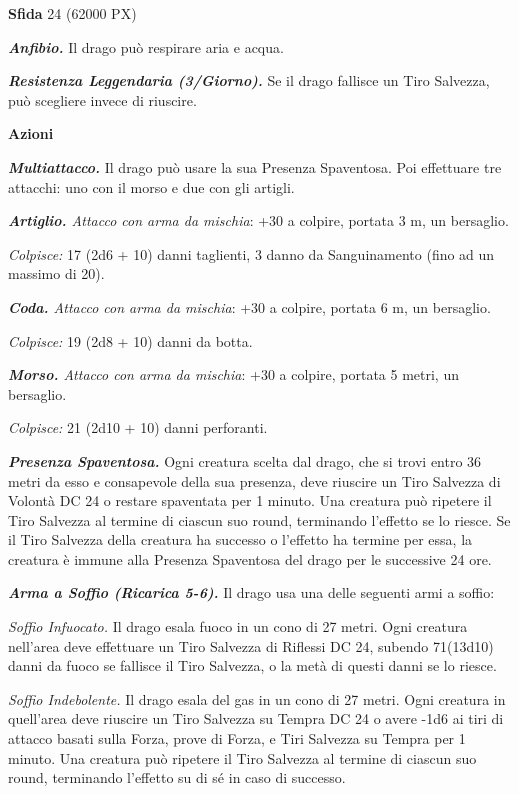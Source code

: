 \begin{multicols}{2}
\textbf{Sfida} 24 (62000 PX)

\textit{\textbf{Anfibio.}} Il drago può respirare aria e acqua.

\textit{\textbf{Resistenza Leggendaria (3/Giorno).}} Se il drago fallisce un Tiro Salvezza, può scegliere invece di riuscire.

\textbf{Azioni}

\textit{\textbf{Multiattacco.}} Il drago può usare la sua Presenza Spaventosa. Poi effettuare tre attacchi: uno con il morso e due con gli artigli.

\textit{\textbf{Artiglio.} Attacco con arma da mischia}: +30 a colpire, portata 3 m, un bersaglio.

\textit{Colpisce:} 17 (2d6 + 10) danni taglienti, 3 danno da Sanguinamento (fino ad un massimo di 20).

\textit{\textbf{Coda.} Attacco con arma da mischia}: +30 a colpire, portata 6 m, un bersaglio.

\textit{Colpisce:} 19 (2d8 + 10) danni da botta.

\textit{\textbf{Morso.} Attacco con arma da mischia}: +30 a colpire, portata 5 metri, un bersaglio.

\textit{Colpisce:} 21 (2d10 + 10) danni perforanti.

\textit{\textbf{Presenza Spaventosa.}} Ogni creatura scelta dal drago, che si trovi entro 36 metri da esso e consapevole della sua presenza, deve riuscire un Tiro Salvezza di Volontà DC 24 o restare spaventata per 1 minuto. Una creatura può ripetere il Tiro Salvezza al termine di ciascun suo round, terminando l'effetto se lo riesce. Se il Tiro Salvezza della creatura ha successo o l'effetto ha termine per essa, la creatura è immune alla Presenza Spaventosa del drago per le successive 24 ore.

\textit{\textbf{Arma a Soffio (Ricarica 5-6).}} Il drago usa una delle seguenti armi a soffio:

\textit{Soffio Infuocato.} Il drago esala fuoco in un cono di 27 metri. Ogni creatura nell'area deve effettuare un Tiro Salvezza di Riflessi DC 24, subendo 71(13d10) danni da fuoco se fallisce il Tiro Salvezza, o la metà di questi danni se lo riesce.

\textit{Soffio Indebolente.} Il drago esala del gas in un cono di 27 metri. Ogni creatura in quell'area deve riuscire un Tiro Salvezza su Tempra DC 24 o avere -1d6 ai tiri di attacco basati sulla Forza, prove di Forza, e Tiri Salvezza su Tempra per 1 minuto. Una creatura può ripetere il Tiro Salvezza al termine di ciascun suo round, terminando l'effetto su di sé in caso di successo.


\end{multicols}
